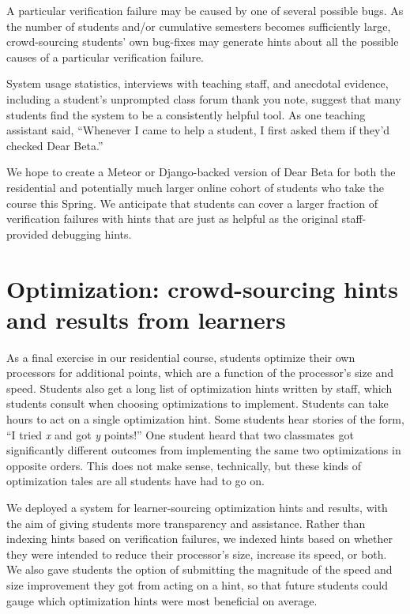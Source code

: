 \documentclass{sigchi}
\begin{document}
A particular verification failure may be caused by one of several possible bugs. As the number of students and/or cumulative semesters becomes sufficiently large, crowd-sourcing students' own bug-fixes may generate hints about all the possible causes of a particular verification failure. 

System usage statistics, interviews with teaching staff, and anecdotal evidence, including a student's unprompted class forum thank you note, suggest that many students find the system to be a consistently helpful tool. As one teaching assistant said, ``Whenever I came to help a student, I first asked them if they'd checked Dear Beta.'' 

We hope to create a Meteor or Django-backed version of Dear Beta for both the residential and potentially much larger online cohort of students who take the course this Spring. We anticipate that students can cover a larger fraction of verification failures with hints that are just as helpful as the original staff-provided debugging hints.


\section{Optimization: crowd-sourcing hints and results from learners}

As a final exercise in our residential course, students optimize their own processors for additional points, which are a function of the processor's size and speed. Students also get a long list of optimization hints written by staff, which students consult when choosing optimizations to implement. Students can take hours to act on a single optimization hint. Some students hear stories of the form, ``I tried {\it x} and got {\it y} points!'' One student heard that two classmates got significantly different outcomes from implementing the same two optimizations in opposite orders. This does not make sense, technically, but these kinds of optimization tales are all students have had to go on. 

We deployed a system for learner-sourcing optimization hints and results, with the aim of giving students more transparency and assistance. Rather than indexing hints based on verification failures, we indexed hints based on whether they were intended to reduce their processor's size, increase its speed, or both. We also gave students the option of submitting the magnitude of the speed and size improvement they got from acting on a hint, so that future students could gauge which optimization hints were most beneficial on average. 
\end{document}
